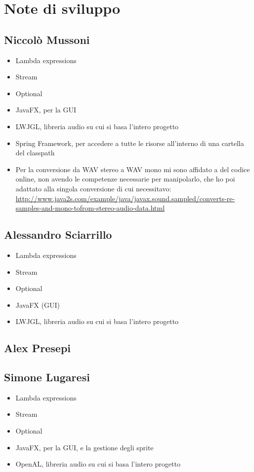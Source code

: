 \documentclass[a4paper,12pt]{report}
\begin{document}
\section{Note di sviluppo}
\subsection*{Niccolò Mussoni}
\begin{itemize}
	\item Lambda expressions
	\item Stream
	\item Optional
	\item JavaFX, per la GUI
	\item LWJGL, libreria audio su cui si basa l’intero progetto
	\item Spring Framework, per accedere a tutte le risorse all’interno di una cartella del classpath
	\item Per la conversione da WAV stereo a WAV mono mi sono affidato a del codice online, non avendo le competenze necessarie per manipolarlo, che ho poi adattato alla singola conversione di cui necessitavo: \url{http://www.java2s.com/example/java/javax.sound.sampled/converts-re-samples-and-mono-tofrom-stereo-audio-data.html}
\end{itemize}
\subsection*{Alessandro Sciarrillo}
\begin{itemize}
	\item Lambda expressions
	\item Stream
	\item Optional
	\item JavaFX (GUI)
	\item LWJGL, libreria audio su cui si basa l’intero progetto

\end{itemize}
\subsection*{Alex Presepi}
\subsection*{Simone Lugaresi}
\begin{itemize}
	\item Lambda expressions
	\item Stream
	\item Optional
	\item JavaFX, per la GUI, e la gestione degli sprite
	\item OpenAL, libreria audio su cui si basa l’intero progetto
\end{itemize}
\end{document}
